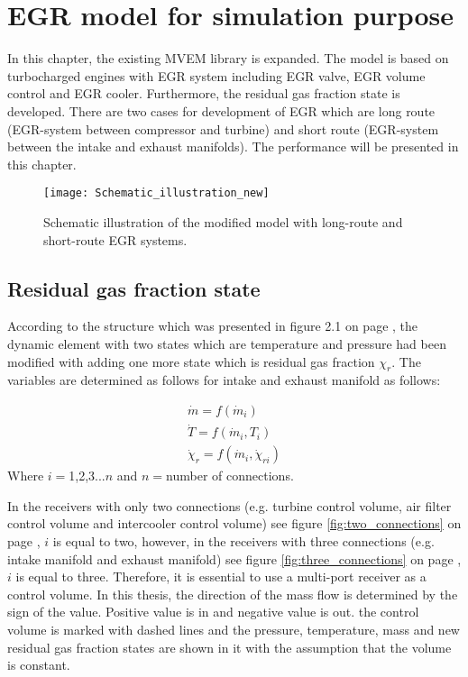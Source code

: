 \chapter{EGR model for simulation purpose}\label{cha:EGRmodel}
In this chapter, the existing MVEM library is expanded. The model is based on turbocharged engines with EGR system including EGR valve, EGR volume control and EGR cooler. Furthermore, the residual gas fraction state is developed. There are two cases for development of EGR which are long route (EGR-system between compressor and turbine) and short route (EGR-system between the intake and exhaust manifolds). The performance will be presented in this chapter.

\begin{figure}
\centering
\texttt{[image: Schematic\_illustration\_new]} 
\label{fig:schematic_new}
\caption{Schematic illustration of the modified model with long-route and short-route EGR systems.}
\end{figure}

\section{Residual gas fraction state}
According to the structure which was presented in figure 2.1 on page \pageref{fig:schematic_new}, the dynamic element with two states which are temperature and pressure had been modified with adding one more state which is residual gas fraction $\chi_r$.  The variables are determined as follows for intake and exhaust manifold as follows:

\begin{align}
\dot{m}=f(\dot{m}_i) \\
\dot{T}=f(\dot{m}_i, T_i) \\
\dot{\chi}_r=f(\dot{m}_i,\dot{\chi}_{ri})
\end{align}
Where $i=$1,2,3...$n$ and $n=$number of connections.

In the receivers with only two connections (e.g. turbine control volume, air filter control volume and intercooler control volume) see figure \ref{fig:two_connections} on page \pageref{fig:two_connections}, $i$ is equal to two, however, in the receivers with three connections (e.g. intake manifold and exhaust manifold) see figure \ref{fig:three_connections} on page \pageref{fig:three_connections}, $i$ is equal to three. Therefore, it is essential to use a multi-port receiver as a control volume. In this thesis, the direction of the mass flow is determined by the sign of the value. Positive value is in and negative value is out. the control volume is marked with dashed lines and the pressure, temperature, mass and new residual gas fraction states are shown in it with the assumption that the volume is constant.


